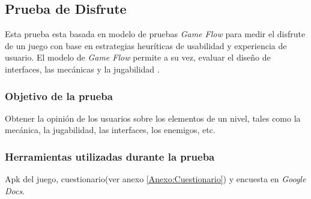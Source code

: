 \subsection{Prueba de Disfrute}
Esta prueba esta basada en modelo de pruebas \textit{Game Flow} para medir el 
disfrute de un juego con base en estrategias heuríticas de usabilidad y experiencia 
de usuario. El modelo de \textit{Game Flow} permite a su vez, evaluar el diseño de 
interfaces, las mecánicas y la jugabilidad \cite{gameflow}.
\subsubsection{Objetivo de la prueba}
Obtener la opinión de los usuarios sobre los elementos de un nivel, tales como 
la mecánica, la jugabilidad, las interfaces, los enemigos, etc.
\subsubsection{Herramientas utilizadas durante la prueba}
Apk del juego, cuestionario(ver anexo \ref{Anexo:Cuestionario}) y encuesta en \textit{Google Docs}.
